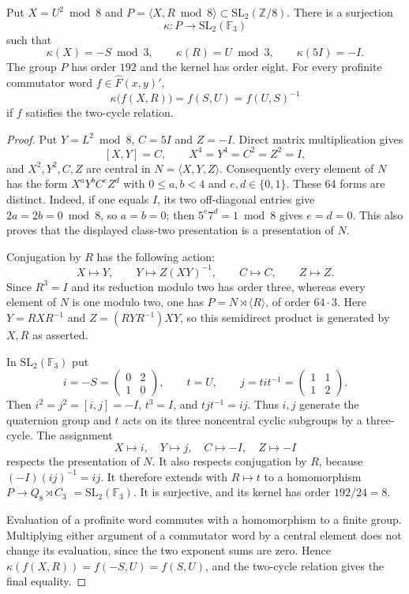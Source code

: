 \begin{proposition}\label{prop:finite-interchange}
Put $X=U^2\bmod8$ and
$P=\langle X,R\bmod8\rangle\subset\mathrm{SL}_2(\mathbb Z/8)$.
There is a surjection
\[
 \kappa:P\longrightarrow\mathrm{SL}_2(\mathbb F_3)
\]
such that
\[
 \kappa(X)=-S\bmod3,\qquad
 \kappa(R)=U\bmod3,\qquad
 \kappa(5I)=-I.
\]
The group $P$ has order $192$ and the kernel has order eight.
For every profinite commutator word $f\in\widehat F(x,y)'$,
\[
 \kappa\bigl(f(X,R)\bigr)=f(S,U)=f(U,S)^{-1}
\]
if $f$ satisfies the two-cycle relation.
\end{proposition}
\begin{proof}
Put $Y=L^2\bmod8$, $C=5I$ and $Z=-I$.  Direct matrix
multiplication gives
\[
 [X,Y]=C,\qquad X^4=Y^4=C^2=Z^2=I,
\]
and $X^2,Y^2,C,Z$ are central in $N=\langle X,Y,Z\rangle$.
Consequently every element of $N$ has the form
$X^aY^bC^eZ^d$ with $0\le a,b<4$ and $e,d\in\{0,1\}$.
These 64 forms are distinct.  Indeed, if one equals $I$, its two
off-diagonal entries give $2a=2b=0\bmod8$, so $a=b=0$;
then $5^e7^d=1\bmod8$ gives $e=d=0$.
This also proves that the displayed class-two presentation is a
presentation of $N$.

Conjugation by $R$ has the following action:
\[
 X\longmapsto Y,\qquad
 Y\longmapsto Z(XY)^{-1},\qquad C\longmapsto C,\qquad
 Z\longmapsto Z.
\]
Since $R^3=I$ and its reduction modulo two has order three,
whereas every element of $N$ is one modulo two, one has
$P=N\rtimes\langle R\rangle$, of order $64\cdot3$.
Here $Y=RXR^{-1}$ and
$Z=(RYR^{-1})XY$, so this semidirect product is generated by
$X,R$ as asserted.

In $\mathrm{SL}_2(\mathbb F_3)$ put
\[
 i=-S=\begin{pmatrix}0&2\\1&0\end{pmatrix},\qquad
 t=U,\qquad
 j=tit^{-1}=\begin{pmatrix}1&1\\1&2\end{pmatrix}.
\]
Then $i^2=j^2=[i,j]=-I$, $t^3=I$, and
$tjt^{-1}=ij$.  Thus $i,j$ generate the quaternion group and
$t$ acts on its three noncentral cyclic subgroups by a three-cycle.
The assignment
\[
 X\mapsto i,\quad Y\mapsto j,\quad C\mapsto-I,\quad Z\mapsto-I
\]
respects the presentation of $N$.  It also respects conjugation by
$R$, because
$(-I)(ij)^{-1}=ij$.  It therefore extends with $R\mapsto t$
to a homomorphism $P\to Q_8\rtimes C_3$
$=\mathrm{SL}_2(\mathbb F_3)$.  It is surjective, and its kernel
has order $192/24=8$.

Evaluation of a profinite word commutes with a homomorphism to a
finite group.  Multiplying either argument of a commutator word
by a central element does not change its evaluation, since the
two exponent sums are zero.  Hence
$\kappa(f(X,R))=f(-S,U)=f(S,U)$, and the two-cycle relation gives
the final equality.
\end{proof}

